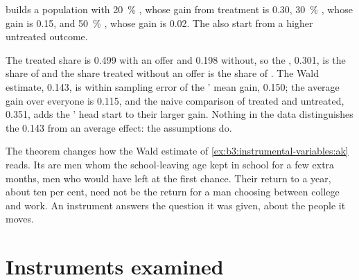  builds a population with 20~\%
, whose gain from treatment is 0.30, 30~\% , whose gain
is 0.15, and 50~\% , whose gain is 0.02. The  also
start from a higher untreated outcome.

\label{lst:b3:instrumental-variables:late}

\label{out:b3:instrumental-variables:late}

The treated share is 0.499 with an offer and 0.198 without, so the ,
0.301, is the share of  and the share treated without an offer is the
share of . The Wald estimate, 0.143, is within sampling error of
the ' mean gain, 0.150; the average gain over everyone is 0.115, and
the naive comparison of treated and untreated, 0.351, adds the '
head start to their larger gain. %
Nothing in the data distinguishes the 0.143 from an average effect: the
assumptions do.

The theorem changes how the Wald estimate of
\cref{ex:b3:instrumental-variables:ak} reads. Its  are men whom the
school-leaving age kept in school for a few extra months, men who would have
left at the first chance. Their return to a year, about ten per cent, need not
be the return for a man choosing between college and work. An instrument
answers the question it was given, about the people it moves.

\section{Instruments examined}\label{sec:b3:instrumental-variables:examined}

